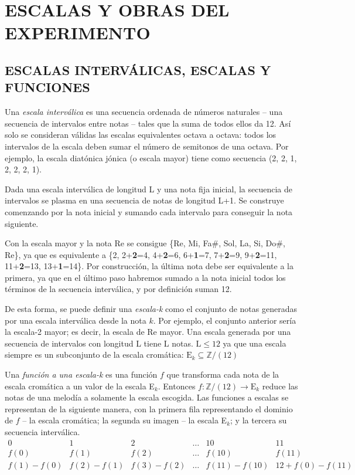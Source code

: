 	\chapter{ESCALAS Y OBRAS DEL EXPERIMENTO}
		
	\section{ESCALAS INTERVÁLICAS, ESCALAS Y FUNCIONES}
	
		Una \textit{escala interválica} es una secuencia ordenada de números naturales -- una secuencia de intervalos entre notas -- tales que la suma de todos ellos da 12. Así solo se consideran válidas las escalas equivalentes octava a octava: todos los intervalos de la escala deben sumar el número de semitonos de una octava. Por ejemplo, la escala diatónica jónica (o escala mayor) tiene como secuencia (2, 2, 1, 2, 2, 2, 1).
		
		Dada una escala interválica de longitud L y una nota fija inicial, la secuencia de intervalos se plasma en una secuencia de notas de longitud L+1. Se construye comenzando por la nota inicial y sumando cada intervalo para conseguir la nota siguiente. 
		
		Con la escala mayor y la nota Re se consigue \{Re, Mi, Fa$\#$, Sol, La, Si, Do$\#$, Re\}, ya que es equivalente a \{2, 2+\textbf{2}=4, 4+\textbf{2}=6, 6+\textbf{1}=7, 7+\textbf{2}=9, 9+\textbf{2}=11, 11+\textbf{2}=13, 13+\textbf{1}=14\}. Por construcción, la última nota debe ser equivalente a la primera, ya que en el último paso habremos sumado a la nota inicial todos los términos de la secuencia interválica, y por definición suman 12.
		
		De esta forma, se puede definir una \textit{escala-k} como el conjunto de notas generadas por una escala interválica desde la nota $k$. Por ejemplo, el conjunto anterior sería la escala-2 mayor; es decir, la escala de Re mayor. Una escala generada por una secuencia de intervalos con longitud L tiene L notas. $\text{L}\leq 12$ ya que una escala siempre es un subconjunto de la escala cromática: $\text{E}_k\subseteq\mathbb{Z}/(12)$
		
		Una \textit{función a una escala-k} es una función $f$ que transforma cada nota de la escala cromática a un valor de la escala E$_k$. Entonces $f : \mathbb{Z}/(12) \rightarrow \text{E}_k$ reduce las notas de una melodía a solamente la escala escogida. Las funciones a escalas se representan de la siguiente manera, con la primera fila representando el dominio de $f$ -- la escala cromática; la segunda su imagen -- la escala E$_k$; y la tercera su secuencia interválica.		
		$$\left.\begin{matrix}
		0&1&2&\ldots&10&11\\
		f(0)&f(1)&f(2)&\ldots&f(10)&f(11)\\
		f(1)-f(0)&f(2)-f(1)&f(3)-f(2)&\ldots&f(11)-f(10)&12+f(0)-f(11)
		\end{matrix}\right.$$
		
